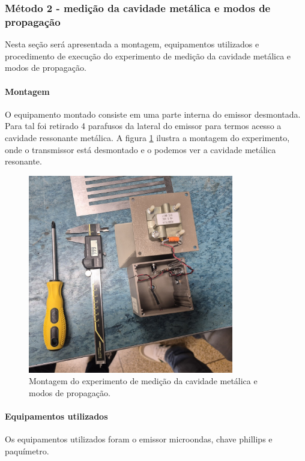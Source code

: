 \documentclass[12pt]{article}
\begin{document}
\subsubsection{Método 2 - medição da cavidade metálica e modos de propagação}
Nesta seção será apresentada a montagem, equipamentos utilizados e
procedimento de execução do experimento de medição da cavidade
metálica e modos de propagação.

\paragraph{Montagem}
O equipamento montado consiste em uma parte interna do emissor
desmontada. Para tal foi retirado 4 parafusos da lateral do emissor
para termos acesso a cavidade ressonante metálica. A figura
\ref{fig:img/metodo2montagem.png} ilustra a montagem do experimento,
onde o transmissor está desmontado e o podemos ver a cavidade metálica
resonante.

\begin{figure}[H]
  \centering
  \includegraphics[width=0.8\textwidth]{img/metodo2montagem.png}
  \caption{Montagem do experimento de medição da cavidade metálica e
  modos de propagação.}
  \label{fig:img/metodo2montagem.png}
\end{figure}

\paragraph{Equipamentos utilizados}
Os equipamentos utilizados foram o emissor microondas, chave phillips
e paquímetro.
\end{document}
